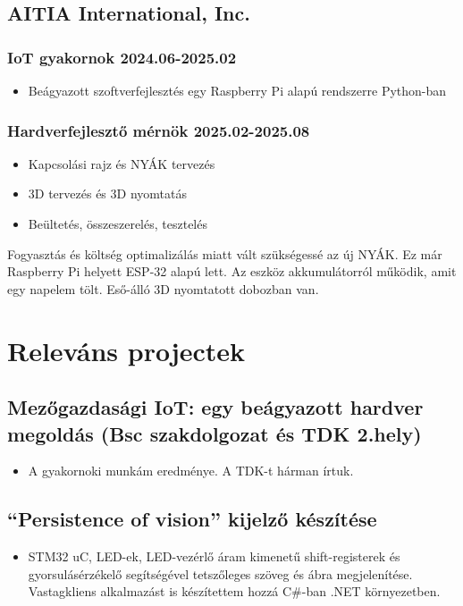 \documentclass{article}
\newcommand{\rside}[1]{\hfill \normalfont\scshape\MakeLowercase{#1}}
\begin{document}
\subsection{AITIA International, Inc.}
\subsubsection{IoT gyakornok \rside{2024.06-2025.02}}
\begin{itemize}
  \item Beágyazott szoftverfejlesztés egy Raspberry Pi alapú rendszerre Python-ban
\end{itemize}
\subsubsection{Hardverfejlesztő mérnök \rside{2025.02-2025.08}}
\begin{itemize}
  \item Kapcsolási rajz és NYÁK tervezés
  \item 3D tervezés és 3D nyomtatás 
  \item Beültetés, összeszerelés, tesztelés
\end{itemize}
Fogyasztás és költség optimalizálás miatt vált szükségessé az új NYÁK. Ez már Raspberry Pi helyett ESP-32 alapú lett. Az eszköz akkumulátorról működik, amit egy napelem tölt. Eső-álló 3D nyomtatott dobozban van.
\section{\faFlask\enspace Releváns projectek}

\subsection{Mezőgazdasági IoT: egy beágyazott hardver megoldás (Bsc szakdolgozat és TDK 2.hely)}
\begin{itemize}
  \item A gyakornoki munkám eredménye. A TDK-t hárman írtuk.
\end{itemize}

\subsection{\enquote{Persistence of vision} kijelző készítése}
\begin{itemize}
  \item STM32 uC, LED-ek, LED-vezérlő áram kimenetű shift-registerek és 
gyorsulásérzékelő segítségével tetszőleges szöveg és ábra megjelenítése. Vastagkliens alkalmazást is készítettem hozzá C\#-ban .NET környezetben.
\end{itemize}
\end{document}
